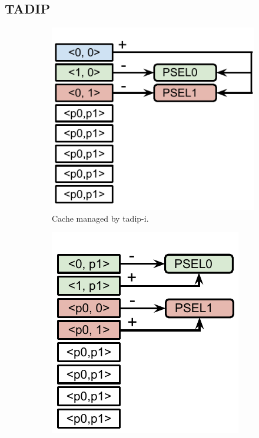 \subsection{TADIP}
\label{sec:algorithms:tadip}

\begin{figure}[t]
    \centering
    \begin{subfigure}[b]{0.45\textwidth}
        \includegraphics[width=\textwidth]{figures/algorithms/TADIP-I}
        \caption{Cache managed by \gls{tadip-i}.}
        \label{fig:algorithms:tadip:isolated}
    \end{subfigure}
    \begin{subfigure}[b]{0.45\textwidth}
        \includegraphics[width=\textwidth]{figures/algorithms/TADIP-F}

\end{subfigure}
\end{figure}

